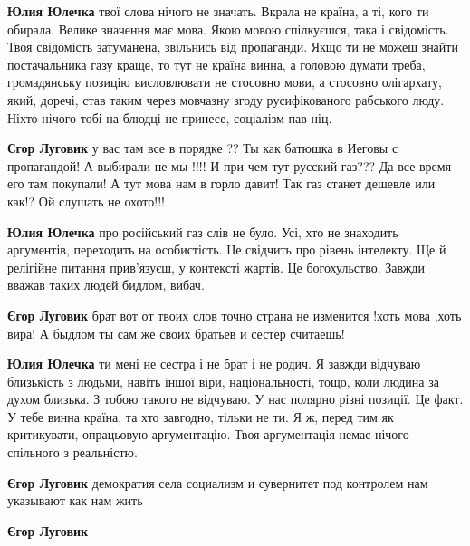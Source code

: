 \begin{itemize}
\begin{itemize}
\textbf{Юлия Юлечка} твої слова нічого не значать. Вкрала не країна, а ті, кого ти обирала. Велике значення має мова. Якою мовою спілкуєшся, така і свідомість. Твоя свідомість затуманена, звільнись від пропаганди. Якщо ти не можеш знайти постачальника газу краще, то тут не країна винна, а головою думати треба, громадянську позицію висловлювати не стосовно мови, а стосовно олігархату, який, доречі, став таким через мовчазну згоду русифікованого рабського люду. Ніхто нічого тобі на блюдці не принесе, соціалізм пав ніц.

\textbf{Єгор Луговик} у вас там все в порядке ??
Ты как батюшка в Иеговы с пропагандой!
А выбирали не мы !!!!
И при чем тут русский газ???
Да все время его там покупали!
А тут мова нам в горло давит!
Так газ станет дешевле или как!?
Ой слушать не охото!!!

\textbf{Юлия Юлечка} про російський газ слів не було. Усі, хто не знаходить
аргументів, переходить на особистість. Це свідчить про рівень інтелекту. Ще й
релігійне питання прив'язуєш, у контексті жартів. Це богохульство. Завжди
вважав таких людей бидлом, вибач.

\textbf{Єгор Луговик} брат вот от твоих слов точно страна не изменится !хоть
мова ,хоть вира!  А быдлом ты сам же своих братьев и сестер считаешь!

\textbf{Юлия Юлечка} ти мені не сестра і не брат і не родич. Я завжди відчуваю
близькість з людьми, навіть іншої віри, національності, тощо, коли людина за
духом близька. З тобою такого не відчуваю. У нас полярно різні позиції. Це
факт. У тебе винна країна, та хто завгодно, тільки не ти. Я ж, перед тим як
критикувати, опрацьовую аргументацію. Твоя аргументація немає нічого спільного
з реальністю.

\textbf{Єгор Луговик} демократия села социализм и сувернитет под контролем нам указывают как нам жить

\textbf{Єгор Луговик}


\end{itemize}
\end{itemize}
